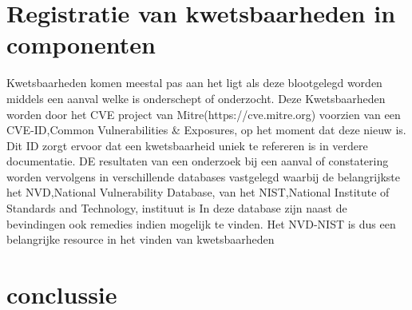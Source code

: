 \section{Registratie van kwetsbaarheden in componenten}\label{sec:registratie-van-kwetsbaarheden-in-bibliotheken}
Kwetsbaarheden komen meestal pas aan het ligt als deze blootgelegd worden middels een aanval welke is onderschept of onderzocht. Deze Kwetsbaarheden worden door het CVE project van Mitre(https://cve.mitre.org) voorzien van een CVE-ID,Common Vulnerabilities & Exposures, op het moment dat deze nieuw is. Dit ID zorgt ervoor dat een kwetsbaarheid uniek te refereren is in verdere documentatie. DE resultaten van een onderzoek bij een aanval of constatering worden vervolgens in verschillende databases vastgelegd waarbij de belangrijkste het NVD,National Vulnerability Database,  van het NIST,National Institute of Standards and Technology, instituut is
In deze database zijn naast de bevindingen ook remedies indien mogelijk te vinden. Het NVD-NIST is dus een belangrijke resource in het vinden van kwetsbaarheden



\section{conclussie}
